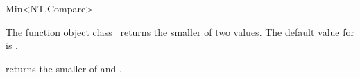 \begin{ccRefFunctionObjectClass}{Min<NT,Compare>}

\ccDefinition

The function object class \ccRefName\ returns the smaller of two values.
The default value for  is .



\ccIsModel
{}

{returns the smaller of  and .}

\end{ccRefFunctionObjectClass}
